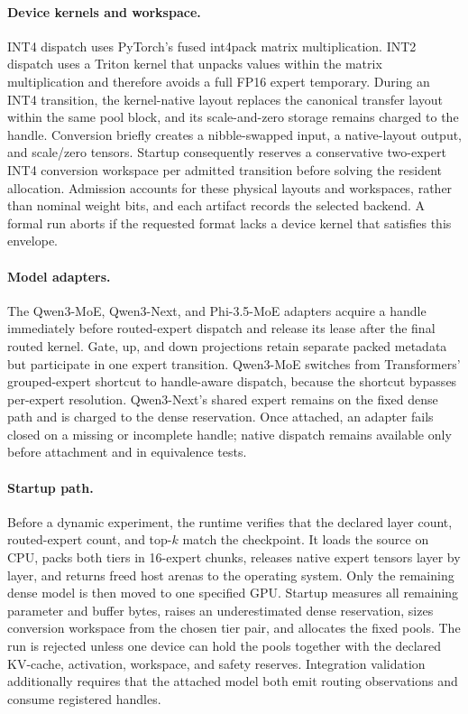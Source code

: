 \paragraph{Device kernels and workspace.}
INT4 dispatch uses PyTorch's fused int4pack matrix multiplication. INT2 dispatch uses a Triton kernel that unpacks values within the matrix multiplication and therefore avoids a full FP16 expert temporary. During an INT4 transition, the kernel-native layout replaces the canonical transfer layout within the same pool block, and its scale-and-zero storage remains charged to the handle. Conversion briefly creates a nibble-swapped input, a native-layout output, and scale/zero tensors. Startup consequently reserves a conservative two-expert INT4 conversion workspace per admitted transition before solving the resident allocation. Admission accounts for these physical layouts and workspaces, rather than nominal weight bits, and each artifact records the selected backend. A formal run aborts if the requested format lacks a device kernel that satisfies this envelope.

\paragraph{Model adapters.}
The Qwen3-MoE, Qwen3-Next, and Phi-3.5-MoE adapters acquire a handle immediately before routed-expert dispatch and release its lease after the final routed kernel. Gate, up, and down projections retain separate packed metadata but participate in one expert transition. Qwen3-MoE switches from Transformers' grouped-expert shortcut to handle-aware dispatch, because the shortcut bypasses per-expert resolution. Qwen3-Next's shared expert remains on the fixed dense path and is charged to the dense reservation. Once attached, an adapter fails closed on a missing or incomplete handle; native dispatch remains available only before attachment and in equivalence tests.

\paragraph{Startup path.}
Before a dynamic experiment, the runtime verifies that the declared layer count, routed-expert count, and top-$k$ match the checkpoint. It loads the source on CPU, packs both tiers in 16-expert chunks, releases native expert tensors layer by layer, and returns freed host arenas to the operating system. Only the remaining dense model is then moved to one specified GPU. Startup measures all remaining parameter and buffer bytes, raises an underestimated dense reservation, sizes conversion workspace from the chosen tier pair, and allocates the fixed pools. The run is rejected unless one device can hold the pools together with the declared KV-cache, activation, workspace, and safety reserves. Integration validation additionally requires that the attached model both emit routing observations and consume registered handles.

